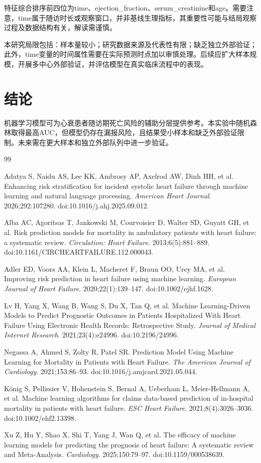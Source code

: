 \documentclass[UTF8,a4paper,12pt]{ctexart}
\begin{document}
特征综合排序前四位为time、ejection\_fraction、serum\_creatinine和age。需要注意，time属于随访时长或观察窗口，并非基线生理指标，其重要性可能与结局观察过程及数据结构有关，解读需谨慎。

本研究局限包括：样本量较小；研究数据来源及代表性有限；缺乏独立外部验证；此外，time变量的时间属性需要在实际预测时点加以审慎处理。后续应扩大样本规模，开展多中心外部验证，并评估模型在真实临床流程中的表现。

\section{结论}
机器学习模型可为心衰患者随访期死亡风险的辅助分层提供参考。本实验中随机森林取得最高AUC，但模型仍存在漏报风险，且结果受小样本和缺乏外部验证限制。未来需在更大样本和独立外部队列中进一步验证。



\begin{thebibliography}{99}

Adatya S, Naidu AS, Lee KK, Ambrosy AP, Axelrod AW, Dinh HH, et al.
Enhancing risk stratification for incident systolic heart failure through machine learning and natural language processing.
\textit{American Heart Journal}. 2026;292:107280.
doi:10.1016/j.ahj.2025.09.012.

Alba AC, Agoritsas T, Jankowski M, Courvoisier D, Walter SD, Guyatt GH, et al.
Risk prediction models for mortality in ambulatory patients with heart failure: a systematic review.
\textit{Circulation: Heart Failure}. 2013;6(5):881--889.
doi:10.1161/CIRCHEARTFAILURE.112.000043.

Adler ED, Voors AA, Klein L, Macheret F, Braun OO, Urey MA, et al.
Improving risk prediction in heart failure using machine learning.
\textit{European Journal of Heart Failure}. 2020;22(1):139--147.
doi:10.1002/ejhf.1628.

Lv H, Yang X, Wang B, Wang S, Du X, Tan Q, et al.
Machine Learning-Driven Models to Predict Prognostic Outcomes in Patients Hospitalized With Heart Failure Using Electronic Health Records: Retrospective Study.
\textit{Journal of Medical Internet Research}. 2021;23(4):e24996.
doi:10.2196/24996.

Negassa A, Ahmed S, Zolty R, Patel SR.
Prediction Model Using Machine Learning for Mortality in Patients with Heart Failure.
\textit{The American Journal of Cardiology}. 2021;153:86--93.
doi:10.1016/j.amjcard.2021.05.044.

König S, Pellissier V, Hohenstein S, Bernal A, Ueberham L,
Meier-Hellmann A, et al.
Machine learning algorithms for claims data-based prediction of in-hospital mortality in patients with heart failure.
\textit{ESC Heart Failure}. 2021;8(4):3026--3036.
doi:10.1002/ehf2.13398.

Xu Z, Hu Y, Shao X, Shi T, Yang J, Wan Q, et al.
The efficacy of machine learning models for predicting the prognosis of heart failure: A systematic review and Meta-Analysis.
\textit{Cardiology}. 2025;150:79--97.
doi:10.1159/000538639.

\end{thebibliography}
\end{document}
